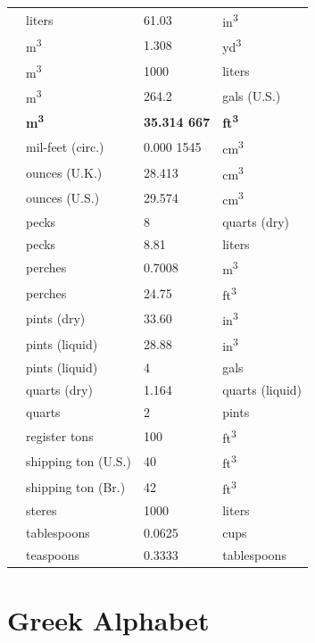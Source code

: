 \documentclass[
]{book}
\begin{document}
\begin{longtable}[]{@{}llll@{}}
& liters & 61.03 & in\textsuperscript{3}\tabularnewline
& m\textsuperscript{3} & 1.308 & yd\textsuperscript{3}\tabularnewline
& m\textsuperscript{3} & 1000 & liters\tabularnewline
& m\textsuperscript{3} & 264.2 & gals (U.S.)\tabularnewline
& \textbf{m\textsuperscript{3}} & \textbf{35.314 667} & \textbf{ft\textsuperscript{3}}\tabularnewline
& mil-feet (circ.) & 0.000 1545 & cm\textsuperscript{3}\tabularnewline
& ounces (U.K.) & 28.413 & cm\textsuperscript{3}\tabularnewline
& ounces (U.S.) & 29.574 & cm\textsuperscript{3}\tabularnewline
& pecks & 8 & quarts (dry)\tabularnewline
& pecks & 8.81 & liters\tabularnewline
& perches & 0.7008 & m\textsuperscript{3}\tabularnewline
& perches & 24.75 & ft\textsuperscript{3}\tabularnewline
& pints (dry) & 33.60 & in\textsuperscript{3}\tabularnewline
& pints (liquid) & 28.88 & in\textsuperscript{3}\tabularnewline
& pints (liquid) & 4 & gals\tabularnewline
& quarts (dry) & 1.164 & quarts (liquid)\tabularnewline
& quarts & 2 & pints\tabularnewline
& register tons & 100 & ft\textsuperscript{3}\tabularnewline
& shipping ton (U.S.) & 40 & ft\textsuperscript{3}\tabularnewline
& shipping ton (Br.) & 42 & ft\textsuperscript{3}\tabularnewline
& steres & 1000 & liters\tabularnewline
& tablespoons & 0.0625 & cups\tabularnewline
& teaspoons & 0.3333 & tablespoons\tabularnewline
\bottomrule
\end{longtable}

\hypertarget{greek-alphabet}{%
\section{Greek Alphabet}\label{greek-alphabet}}
\end{document}

